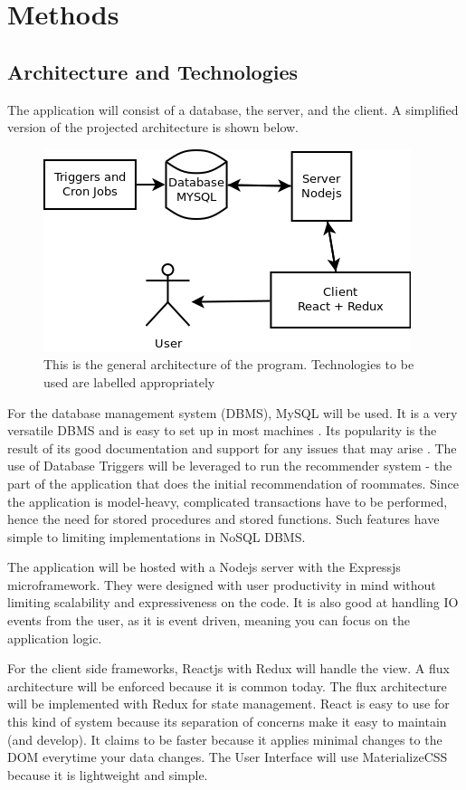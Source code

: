 \documentclass[journal]{./IEEE/IEEEtran}
\begin{document}
\section{Methods}

\subsection{Architecture and Technologies}
The application will consist of a database, the server, and the client. A simplified version of the projected
architecture is shown below.

\begin{figure}[h]
\centering
\includegraphics[scale=0.5]{Architecture}
\caption{This is the general architecture of the program. Technologies to be used are labelled appropriately}
\end{figure}

For the database management system (DBMS), MySQL will be used. It is a very versatile DBMS and is easy to set up in most
machines \cite{mysqlpage}. Its popularity is the result of its good documentation and support for any issues that may
arise \cite{mysqlpage}. The use of Database Triggers will be leveraged to run the recommender system - the part of the
application that does the initial recommendation of roommates. Since the application is model-heavy, complicated
transactions have to be performed, hence the need for stored procedures and stored functions. Such features have simple
to limiting implementations in NoSQL DBMS.

The application will be hosted with a Nodejs server with the Expressjs microframework. They were designed with user
productivity in mind without limiting scalability and expressiveness on the code. It is also good at handling IO events
from the user, as it is event driven, meaning you can focus on the application logic.

For the client side frameworks, Reactjs with Redux will handle the view. A flux architecture will be enforced because it
is common today. The flux architecture will be implemented with Redux for state management. React is easy to use for
this kind of system because its separation of concerns make it easy to maintain (and develop). It claims to be faster
because it applies minimal changes to the DOM everytime your data changes. The User Interface will use MaterializeCSS
because it is lightweight and simple.
\end{document}
